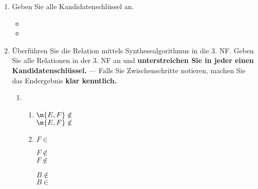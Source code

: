\documentclass{lehramt-informatik-aufgabe}
\begin{document}
\begin{enumerate}


\item Geben Sie alle Kandidatenschlüssel an.

\begin{liAntwort}
\begin{itemize}
\item {}
\item {}
\end{itemize}
\end{liAntwort}


\item Überführen Sie die Relation mittels Synthesealgorithmus in die 3.
NF. Geben Sie alle Relationen in der 3. NF an und \textbf{unterstreichen
Sie in jeder einen Kandidatenschlüssel.} — Falls Sie Zwischenschritte
notieren, machen Sie das Endergebnis \textbf{klar kenntlich.}

\begin{liAntwort}
\begin{enumerate}
\item {}
\begin{enumerate}
\item {}


$\m{E, F} \notin$ \\
$\m{E, F} \notin$ 


\item {}


$F \in$ 


$F \notin$ \\
$F \notin$ 


$B \notin$ \\
$B \in$ 



\end{enumerate}
\end{enumerate}
\end{liAntwort}
\end{enumerate}
\end{document}
